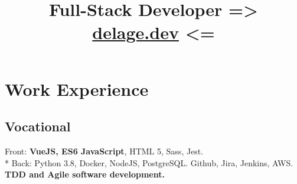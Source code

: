 \documentclass[11pt,a4paper,sans]{moderncv}
\title{Full-Stack Developer => \href{https://delage.dev/} {delage.dev} <=}
\begin{document}
\makecvtitle

\section{Work Experience}
\subsection{Vocational}

{{ Front: \textbf{VueJS, ES6 JavaScript}, HTML 5, Sass, Jest.  \\* 
Back: Python 3.8, Docker, NodeJS, PostgreSQL. Github, Jira, Jenkins, AWS. \textbf{TDD and Agile software development.}} \href{https://www.deepreach.com/} {}}
\end{document}
